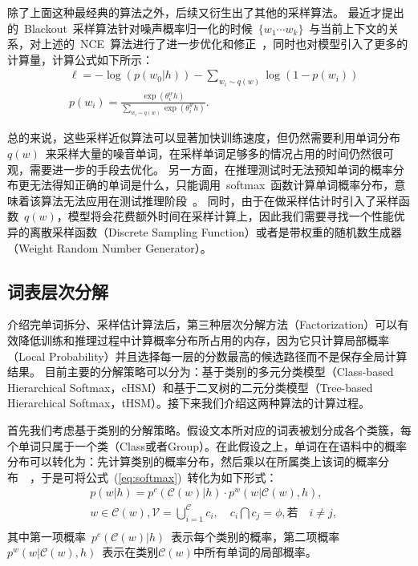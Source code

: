除了上面这种最经典的算法之外，后续又衍生出了其他的采样算法。
最近才提出的~Blackout~采样算法针对噪声概率归一化的时候~$\{w_1\cdots w_k\}$~与当前上下文的关系，对上述的~NCE~算法进行了进一步优化和修正~，同时也对模型引入了更多的计算量，计算公式如下所示：
\begin{equation}
\begin{split}
&\ell=-\log(p(w_0|h)) - \sum_{w_i \sim q(w)} \log(1 - p(w_i))\\
&p(w_i) = \frac{\exp(\theta^w_i h)}{\sum_{w_i \sim q(w)} \exp(\theta^w_i h)}.
\end{split}
\end{equation}

总的来说，这些采样近似算法可以显著加快训练速度，但仍然需要利用单词分布$q(w)$~来采样大量的噪音单词，在采样单词足够多的情况占用的时间仍然很可观，需要进一步的手段去优化。
另一方面，在推理测试时无法预知单词的概率分布更无法得知正确的单词是什么，只能调用~softmax~函数计算单词概率分布，意味着该算法无法应用在测试推理阶段~。
同时，由于在做采样估计时引入了采样函数~$q(w)$，模型将会花费额外时间在采样计算上，因此我们需要寻找一个性能优异的离散采样函数（Discrete Sampling Function）或者是带权重的随机数生成器（Weight Random Number Generator）。


\subsection{词表层次分解}
介绍完单词拆分、采样估计算法后，第三种层次分解方法（Factorization）可以有效降低训练和推理过程中计算概率分布所占用的内存，因为它只计算局部概率（Local Probability）并且选择每一层的分数最高的候选路径而不是保存全局计算结果。
目前主要的分解策略可以分为：基于类别的多元分类模型（Class-based Hierarchical Softmax，cHSM）和基于二叉树的二元分类模型（Tree-based Hierarchical Softmax，tHSM）。接下来我们介绍这两种算法的计算过程。

首先我们考虑基于类别的分解策略。假设文本所对应的词表被划分成各个类簇，每个单词只属于一个类（Class或者Group）。在此假设之上，单词在在语料中的概率分布可以转化为：先计算类别的概率分布，然后乘以在所属类上该词的概率分布~~，于是可将公式~(\ref{eq:softmax})~转化为如下形式：
\begin{equation}
\begin{split}
&p(w|h)=p^c(\mathcal{C}(w)|h)\cdot p^w(w|\mathcal{C}(w),h) ,\\
 & w\in \mathcal{C}(w),\mathcal{V}=\bigcup _{i = 1}^\mathcal{C}{c_i}, \quad  c_i \bigcap c_j=\phi, \text{若}\quad i\ne j, \\
\end{split}
\end{equation}
其中第一项概率~$p^c(\mathcal{C}(w)|h)$~表示每个类别的概率，第二项概率~$p^w(w|\mathcal{C}(w),h)$~表示在类别$\mathcal{C}(w)$中所有单词的局部概率。

